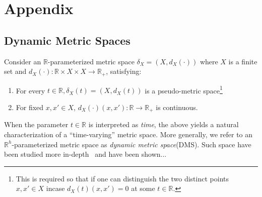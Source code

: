 \documentclass[10pt]{article}
\begin{document}
\section{Appendix}

\subsection*{Dynamic Metric Spaces}
Consider an $\mathbb{R}$-parameterized metric space $\delta_X = ( X, d_X(\cdot) )$ where
$X$ is a finite set and $d_X(\cdot): \mathbb{R} \times X \times X \to \mathbb{R}_{+}$, satisfying: 
\begin{enumerate}
	\item For every $t \in \mathbb{R}, \delta_X(t) = (X, d_X(t))$ is a pseudo-metric space\footnote{This is required so that if one can distinguish the two distinct points $x, x' \in X$ incase $d_X(t)(x, x') = 0$ at some $t \in \mathbb{R}$. } 
	\item For fixed $x, x' \in X$, $d_X(\cdot)(x, x'): \mathbb{R} \to \mathbb{R}_{+}$ is continuous.
\end{enumerate}
When the parameter $t \in \mathbb{R}$ is interpreted as \emph{time}, the above yields a natural characterization of a ``time-varying'' metric space. More generally, we refer to an $\mathbb{R}^h$-parameterized metric space as \emph{dynamic metric space}(DMS). Such space have been studied more in-depth~\cite{} and have been shown...
 
\end{document}
